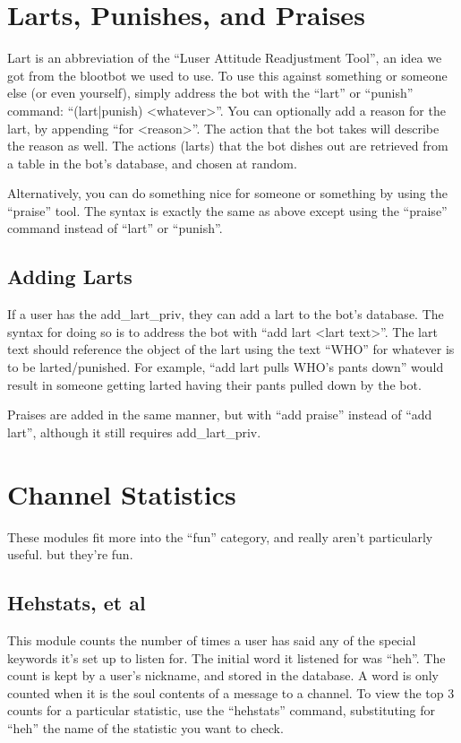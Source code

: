 \documentclass[titlepage]{article}
\begin{document}
	\section{Larts, Punishes, and Praises}
		Lart is an abbreviation of the ``Luser Attitude Readjustment Tool'',
		an idea we got from the blootbot we used to use.  To use this against
		something or someone else (or even yourself), simply address the bot
		with the ``lart'' or ``punish'' command: ``(lart|punish) <whatever>''.
		You can optionally add a reason for the lart, by appending ``for
		<reason>''.  The action that the bot takes will describe the reason as
		well.  The actions (larts) that the bot dishes out are retrieved from
		a table in the bot's database, and chosen at random.

		Alternatively, you can do something nice for someone or something by
		using the ``praise'' tool.  The syntax is exactly the same as above
		except using the ``praise'' command instead of ``lart'' or ``punish''.

		\subsection{Adding Larts}
			If a user has the add\_lart\_priv, they can add a lart to the
			bot's database.  The syntax for doing so is to address the bot
			with ``add lart <lart text>''.  The lart text should reference the
			object of the lart using the text ``WHO'' for whatever is to be
			larted/punished.  For example, ``add lart pulls WHO's pants down''
			would result in someone getting larted having their pants pulled
			down by the bot.

			Praises are added in the same manner, but with ``add praise''
			instead of ``add lart'', although it still requires
			add\_lart\_priv.

	\section{Channel Statistics}
		These modules fit more into the ``fun'' category, and really 
		aren't particularly useful.  but they're fun.
		\subsection{Hehstats, et al}
			This module counts the number of times a user has said
			any of the special keywords it's set up to listen for.  The
			initial word it listened for was ``heh''.  The count is kept
			by a user's nickname, and stored in the database.  A word is
			only counted when it is the soul contents of a message to a
			channel.  To view the top 3 counts for a particular
			statistic, use the ``hehstats'' command, substituting for
			``heh'' the name of the statistic you want to check.
\end{document}
